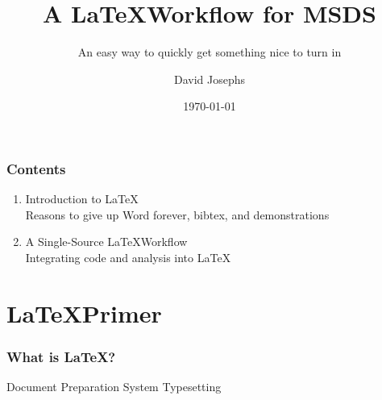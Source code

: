 \documentclass{beamer}
\title{A \LaTeX Workflow for MSDS}
\subtitle{An easy way to quickly get something nice to turn in}
\author{David Josephs}
\date{\today}
\begin{document}
	\setcounter{showProgressBar}{0}
	\setcounter{showSlideNumbers}{0}

	\frame{\titlepage}

	\begin{frame}
		\frametitle{Contents}
		\begin{enumerate}[<+->]
			\item Introduction to \LaTeX \\ \textcolor{ExecusharesGrey}{\footnotesize\hspace{1em} Reasons to give up Word forever, bibtex, and demonstrations}
			\item A Single-Source \LaTeX Workflow  \\ \textcolor{ExecusharesGrey}{\footnotesize\hspace{1em} Integrating code and analysis into \LaTeX}
		\end{enumerate}
	\end{frame}

	\setcounter{framenumber}{0}
	\setcounter{showProgressBar}{1}
	\setcounter{showSlideNumbers}{1}
	\section{\LaTeX Primer}
		\begin{frame}
			\frametitle{What is \LaTeX?}
			\begin{outline}
\1 Document Preparation System
\2 Typesetting
			\end{outline}
		\end{frame}
\end{document}
